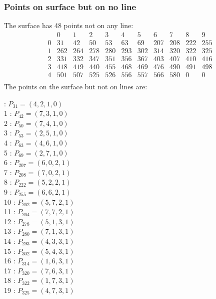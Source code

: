 \documentclass{article}
\begin{document}
{\subsubsection*{Points on surface but on no line}
The surface has 48 points not on any line:\\
$$
\begin{array}{r|*{10}{r}}
 & 0 & 1 & 2 & 3 & 4 & 5 & 6 & 7 & 8 & 9\\
\hline
0 & 31 & 42 & 50 & 53 & 63 & 69 & 207 & 208 & 222 & 255\\
1 & 262 & 264 & 278 & 280 & 293 & 302 & 314 & 320 & 322 & 325\\
2 & 331 & 332 & 347 & 351 & 356 & 367 & 403 & 407 & 410 & 416\\
3 & 418 & 419 & 440 & 455 & 468 & 469 & 476 & 490 & 491 & 498\\
4 & 501 & 507 & 525 & 526 & 556 & 557 & 566 & 580 & 0 & 0\\
\end{array}
$$
The points on the surface but not on lines are:\\
\begin{multicols}{2}
 : $P_{31}=( 4, 2, 1, 0 )$\\
1 : $P_{42}=( 7, 3, 1, 0 )$\\
2 : $P_{50}=( 7, 4, 1, 0 )$\\
3 : $P_{53}=( 2, 5, 1, 0 )$\\
4 : $P_{63}=( 4, 6, 1, 0 )$\\
5 : $P_{69}=( 2, 7, 1, 0 )$\\
6 : $P_{207}=( 6, 0, 2, 1 )$\\
7 : $P_{208}=( 7, 0, 2, 1 )$\\
8 : $P_{222}=( 5, 2, 2, 1 )$\\
9 : $P_{255}=( 6, 6, 2, 1 )$\\
10 : $P_{262}=( 5, 7, 2, 1 )$\\
11 : $P_{264}=( 7, 7, 2, 1 )$\\
12 : $P_{278}=( 5, 1, 3, 1 )$\\
13 : $P_{280}=( 7, 1, 3, 1 )$\\
14 : $P_{293}=( 4, 3, 3, 1 )$\\
15 : $P_{302}=( 5, 4, 3, 1 )$\\
16 : $P_{314}=( 1, 6, 3, 1 )$\\
17 : $P_{320}=( 7, 6, 3, 1 )$\\
18 : $P_{322}=( 1, 7, 3, 1 )$\\
19 : $P_{325}=( 4, 7, 3, 1 )$\\

\end{multicols}}
\end{document}
